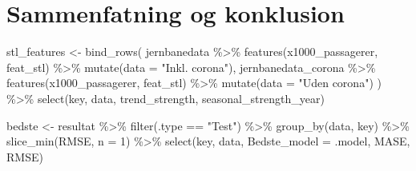 \documentclass[
  danish,
]{article}
\newenvironment{Shaded}{\begin{snugshade}}{\end{snugshade}}
\newcommand{\AttributeTok}[1]{\textcolor[rgb]{0.40,0.45,0.13}{#1}}
\newcommand{\DecValTok}[1]{\textcolor[rgb]{0.68,0.00,0.00}{#1}}
\newcommand{\FunctionTok}[1]{\textcolor[rgb]{0.28,0.35,0.67}{#1}}
\newcommand{\NormalTok}[1]{\textcolor[rgb]{0.00,0.23,0.31}{#1}}
\newcommand{\OtherTok}[1]{\textcolor[rgb]{0.00,0.23,0.31}{#1}}
\newcommand{\SpecialCharTok}[1]{\textcolor[rgb]{0.37,0.37,0.37}{#1}}
\newcommand{\StringTok}[1]{\textcolor[rgb]{0.13,0.47,0.30}{#1}}
\begin{document}
\section{Sammenfatning og konklusion}\label{sammenfatning-og-konklusion}

\begin{Shaded}
\begin{Highlighting}[]
\NormalTok{stl\_features }\OtherTok{\textless{}{-}} \FunctionTok{bind\_rows}\NormalTok{(}
\NormalTok{  jernbanedata        }\SpecialCharTok{\%\textgreater{}\%} \FunctionTok{features}\NormalTok{(x1000\_passagerer, feat\_stl) }\SpecialCharTok{\%\textgreater{}\%} \FunctionTok{mutate}\NormalTok{(}\AttributeTok{data =} \StringTok{"Inkl. corona"}\NormalTok{),}
\NormalTok{  jernbanedata\_corona }\SpecialCharTok{\%\textgreater{}\%} \FunctionTok{features}\NormalTok{(x1000\_passagerer, feat\_stl) }\SpecialCharTok{\%\textgreater{}\%} \FunctionTok{mutate}\NormalTok{(}\AttributeTok{data =} \StringTok{"Uden corona"}\NormalTok{)}
\NormalTok{) }\SpecialCharTok{\%\textgreater{}\%}
  \FunctionTok{select}\NormalTok{(key, data, trend\_strength, seasonal\_strength\_year)}
\end{Highlighting}
\end{Shaded}

\begin{Shaded}
\begin{Highlighting}[]
\NormalTok{bedste }\OtherTok{\textless{}{-}}\NormalTok{ resultat }\SpecialCharTok{\%\textgreater{}\%}
  \FunctionTok{filter}\NormalTok{(.type }\SpecialCharTok{==} \StringTok{"Test"}\NormalTok{) }\SpecialCharTok{\%\textgreater{}\%}
  \FunctionTok{group\_by}\NormalTok{(data, key) }\SpecialCharTok{\%\textgreater{}\%}
  \FunctionTok{slice\_min}\NormalTok{(RMSE, }\AttributeTok{n =} \DecValTok{1}\NormalTok{) }\SpecialCharTok{\%\textgreater{}\%}
  \FunctionTok{select}\NormalTok{(key, data, }\AttributeTok{Bedste\_model =}\NormalTok{ .model, MASE, RMSE)}
\end{Highlighting}
\end{Shaded}
\end{document}
